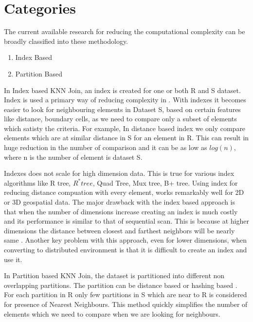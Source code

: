 \documentclass[conference]{IEEEtran}
\begin{document}
\section{Categories}
The current available research for reducing the computational
complexity can be broadly classified into these methodology.
\begin{enumerate}
\item Index Based
\item Partition Based
\end{enumerate}

\medskip

In Index based KNN Join, an index is created for one or both R and S
dataset. Index is used a primary way of reducing complexity in \cite{jagadish_idistance:_2005}
\cite{yu_efficient_2007} \cite{bohm_epsilon_2001}.  With indexes it
becomes easier to look for neighbouring elements in Dataset S, based
on certain features like distance, boundary cells,  as we
need to compare only a subset of elements which satisty the
criteria. For example, In distance based index
\cite{jagadish_idistance:_2005} we only compare elements which are at
similar distance in S for an element in R. This can result in huge
reduction in the number of comparison and it can be as low as $log(n)$, where n is the number of element is
dataset S.

\medskip

Indexes does not scale for high dimension data. This is true for various
index algorithms like R tree, $R^* tree$, Quad Tree, Mux tree, B+
tree. Using index for reducing distance compuation with every element, works
remarkably well for 2D or 3D geospatial data. The major drawback with the
index based approach is that when the number of dimensions increase
creating an index is much costly and its performance is similar to
that of sequential scan. This is because at higher dimensions the distance
between closest and farthest neighbors will be nearly same
\cite{beyer_when_1999}. Another key problem with this approach, even
for lower dimensions, when
converting to distributed environment is that it is difficult to
create an index and use it.

\bigskip

In Partition based KNN Join, the dataset is partitioned into different
non overlapping partitions. The
partition can be distance based\cite{lu_efficient_2012} or hashing
based \cite{stupar_rankreduceprocessing_2010} \cite{yao_k_2010}. For each partition in R only few partitions in S which are
near to R is considered for presence of Nearest Neighbours. This
method quickly simplifies the number of elements which we need to
compare when we are looking for neighbours.
\end{document}
